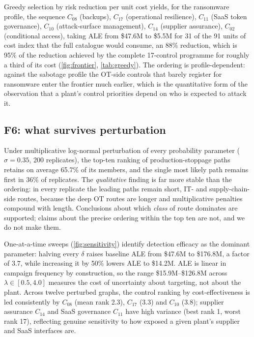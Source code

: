 

Greedy selection by risk reduction per unit cost yields, for the ransomware
profile, the sequence $C_{08}$ (backups), $C_{17}$ (operational resilience),
$C_{11}$ (SaaS token governance), $C_{10}$ (attack-surface management),
$C_{14}$ (supplier assurance), $C_{02}$ (conditional access), taking ALE from
\$47.6M to \$5.5M for 31 of the 91 units of cost index that the full catalogue
would consume, an 88\% reduction, which is 95\% of the reduction achieved by
the complete 17-control programme for roughly a third of its cost
(\cref{fig:frontier}, \cref{tab:greedy}). The ordering is profile-dependent:
against the sabotage profile the OT-side controls that barely register for
ransomware enter the frontier much earlier, which is the quantitative form of
the observation that a plant's control priorities depend on who is expected to
attack it.



\subsection{F6: what survives perturbation}

Under multiplicative log-normal perturbation of every probability parameter
($\sigma = 0.35$, 200 replicates), the top-ten ranking of production-stoppage
paths retains on average 65.7\% of its members, and the single most likely path
remains first in 36\% of replicates. The \emph{qualitative} finding is far more
stable than the ordering: in every replicate the leading paths remain
short, IT- and supply-chain-side routes, because the deep OT routes are longer
and multiplicative penalties compound with length. Conclusions about which
\emph{class} of route dominates are supported; claims about the precise
ordering within the top ten are not, and we do not make them.

One-at-a-time sweeps (\cref{fig:sensitivity}) identify detection efficacy as
the dominant parameter: halving every $\delta$ raises baseline ALE from \$47.6M
to \$176.8M, a factor of $3.7$, while increasing it by 50\% lowers ALE to
\$14.2M. ALE is linear in campaign frequency by construction, so the range
\$15.9M--\$126.8M across $\lambda \in [0.5, 4.0]$ measures the cost of uncertainty about targeting, not about the plant. Across twelve
perturbed graphs, the control ranking by cost-effectiveness is led consistently
by $C_{08}$ (mean rank 2.3), $C_{17}$ (3.3) and $C_{10}$ (3.8); supplier
assurance $C_{14}$ and SaaS governance $C_{11}$ have high variance (best rank
1, worst rank 17), reflecting genuine sensitivity to how exposed a given plant's
supplier and SaaS interfaces are.

